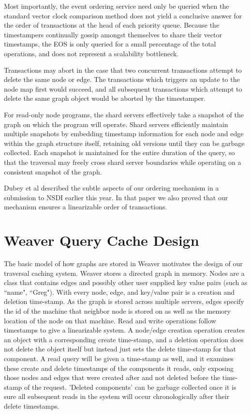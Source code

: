 \documentclass[letterpaper,twocolumn,11pt,tight]{article}
\begin{document}
Most importantly, the event ordering service need only be queried when
    the standard vector clock comparison method does not yield a conclusive
    answer for the order of transactions at the head of each priority queue.
Because the timestampers continually gossip amongst themselves to share
    their vector timestamps, the EOS is only queried for a small percentage of
    the total operations, and does not represent a scalability bottleneck.

Transactions may abort in the case that two concurrent transactions attempt
    to delete the same node or edge.
The transactions which triggers an update to the node map first would succeed,
    and all subsequent transactions which attempt to delete the same graph
    object would be aborted by the timestamper.

For read-only node programs, the shard servers effectively take a snapshot
    of the graph on which the program will operate.
Shard servers efficiently maintain multiple snapshots by embedding timestamp
    information for each node and edge within the graph structure itself,
    retaining old versions until they can be garbage collected.
Each snapshot is maintained for the entire duration of the query, so that the
    traversal may freely cross shard server boundaries while operating on
    a consistent snapshot of the graph.

Dubey et al described the subtle aspects of our ordering mechanism in a submission to NSDI earlier this year. In that paper we also proved that our mechanism ensures a linearizable order of transactions.

\section{Weaver Query Cache Design}\label{sec:cdesign}
The basic model of how graphs are stored in Weaver motivates the design of our traversal caching system. Weaver stores a directed graph in memory. Nodes are a class that contains edges and possibly other user supplied key value pairs (such as ``name", ``Greg"). With every node, edge, and key/value pair is a creation and deletion time-stamp.
As the graph is stored across multiple servers, edges specify the id of the machine that neighbor node is stored on as well as the memory location of the node on that machine.
Read and write operations follow timestamps to give a linearizable system. A node/edge creation operation creates an object with a corresponding create time-stamp, and a deletion operation does not delete the object itself but instead just sets the delete time-stamp for that component. A read query will be given a time-stamp as well, and it examines these create and delete timestamps of the components it reads, only exposing those nodes and edges that were created after and not deleted before the time-stamp of the request. 'Deleted components' can be garbage collected once it is sure all subsequent reads in the system will occur chronologically after their delete timestamps.
\end{document}
